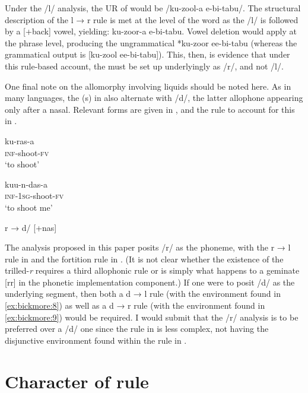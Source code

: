 \documentclass[output=paper
,newtxmath
,modfonts
,nonflat]{langsci/langscibook}
\begin{document}
Under the /l/ analysis, the UR of  would be /ku-zool-a e-bi-tabu/. The structural description of the l → r rule is met at the level of the word as the /l/ is followed by a [+back] vowel, yielding: ku-zoor-a e-bi-tabu. Vowel deletion would apply at the phrase level, producing the ungrammatical *ku-zoor ee-bi-tabu (whereas the grammatical output is [ku-zool ee-bi-tabu]). This, then, is evidence that under this rule-based account, the  must be set up underlyingly as /r/, and not /l/.

One final note on the allomorphy involving liquids should be noted here. As in many  languages, the (s) in  also alternate with /d/, the latter allophone appearing only after a nasal. Relevant  forms are given in , and the rule to account for this in .

\ea\label{ex:bickmore:24}
\ea\label{ex:bickmore:24a}
\gll ku-ras-a\\
\textsc{inf}{}-shoot-\textsc{fv}\\
\glt ‘to shoot’

\ex\label{ex:bickmore:24b}
\gll kuu-n-das-a\\
\textsc{inf}{}-\textsc{1sg}{}-shoot-\textsc{fv}\\
\glt ‘to shoot me’
\z
\z

\ea\label{ex:bickmore:25}
r → d/ [+nas] \underline{ }\underline{ }\underline{ }  
\z

The analysis proposed in this paper posits /r/ as the phoneme, with the r → l rule in  and the fortition rule in . (It is not clear whether the existence of the trilled-\textit{r} requires a third allophonic rule or is simply what happens to a geminate [rr] in the phonetic implementation component.) If one were to posit /d/ as the underlying segment, then both a d → l rule (with the environment found in \ref{ex:bickmore:8}) as well as a d → r rule (with the environment found in \ref{ex:bickmore:9}) would be required. I would submit that the /r/ analysis is to be preferred over a /d/ one since the rule in  is less complex, not having the disjunctive environment found within the rule in . 

\section{Character of rule}
\end{document}
